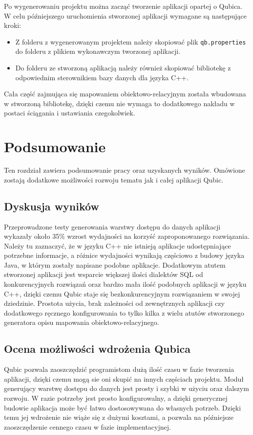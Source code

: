 \documentclass[12pt]{report}
\begin{document}
Po wygenerowaniu projektu można zacząć tworzenie aplikacji opartej o Qubica. W celu późniejszego uruchomienia stworzonej aplikacji wymagane są następujące kroki:

\begin{itemize}
\item Z folderu z wygenerowanym projektem należy skopiować plik {\tt qb.properties} do folderu z plikiem wykonawczym tworzonej aplikacji.
\item Do folderu ze stworzoną aplikacją należy również skopiować bibliotekę z odpowiednim sterownikiem bazy danych dla języka C++.
\end{itemize}

 Cała część zajmująca się mapowaniem obiektowo-relacyjnym została wbudowana w stworzoną bibliotekę, dzięki czemu nie wymaga to dodatkowego nakładu w postaci ściągania i ustawiania czegokolwiek.

\chapter{Podsumowanie}
Ten rozdział zawiera podsumowanie pracy oraz uzyskanych wyników. Omówione zostają dodatkowe możliwości rozwoju tematu jak i całej aplikacji Qubic.
\section{Dyskusja wyników}
Przeprowadzone testy generowania warstwy dostępu do danych aplikacji wykazały około 35\% wzrost wydajności na korzyść zaproponowanego rozwiązania. Należy tu zaznaczyć, że w języku C++ nie istnieją aplikacje udostępniające potrzebne informacje, a różnice wydajności wynikają częściowo z budowy języka Java, w którym zostały napisane podobne aplikacje. Dodatkowym atutem stworzonej aplikacji jest wsparcie większej ilości dialektów SQL od konkurencyjnych rozwiązań oraz bardzo mała ilość podobnych aplikacji w języku C++, dzięki czemu Qubic staje się bezkonkurencyjnym rozwiązaniem w swojej dziedzinie. Prostota użycia, brak zależności od zewnętrznych aplikacji czy dodatkowego ręcznego konfigurowania to tylko kilka z wielu atutów stworzonego generatora opisu mapowania obiektowo-relacyjnego.
\section{Ocena możliwości wdrożenia Qubica}
Qubic pozwala zaoszczędzić programistom dużą ilość czasu w fazie tworzenia aplikacji, dzięki czemu mogą sie oni skupić na innych częściach projektu. Moduł generujący warstwę dostępu do danych jest prosty i szybki w użyciu oraz dalszym rozwoju. W razie potrzeby jest prosto konfigurowalny, a dzięki generycznej budowie aplikacja może być łatwo dostosowywana do własnych potrzeb. Dzięki temu jej wdrożenie nie wiąże się z dużymi kosztami, a pozwala na późniejsze zaoszczędzenie cennego czasu w fazie implementacyjnej.
\end{document}
